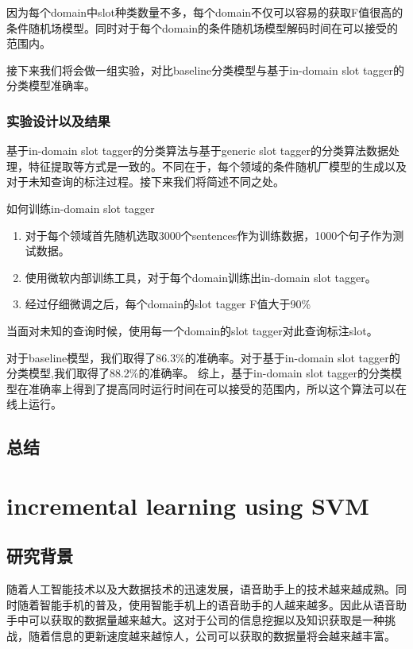 \documentclass[master]{njuthesis}
\begin{document}
\begin{enumerate}
\begin{enumerate}
\begin{enumerate}
    因为每个domain中slot种类数量不多，每个domain不仅可以容易的获取F值很高的条件随机场模型。同时对于每个domain的条件随机场模型解码时间在可以接受的范围内。
    
    接下来我们将会做一组实验，对比baseline分类模型与基于in-domain slot tagger的分类模型准确率。

\subsection{实验设计以及结果}
    
    基于in-domain slot tagger的分类算法与基于generic slot tagger的分类算法数据处理，特征提取等方式是一致的。不同在于，每个领域的条件随机厂模型的生成以及对于未知查询的标注过程。接下来我们将简述不同之处。
   
    如何训练in-domain slot tagger
    \begin{enumerate}
      \item 对于每个领域首先随机选取3000个sentences作为训练数据，1000个句子作为测试数据。
      \item 使用微软内部训练工具，对于每个domain训练出in-domain slot tagger。
      \item 经过仔细微调之后，每个domain的slot tagger F值大于90\%
    \end{enumerate}

    当面对未知的查询时候，使用每一个domain的slot tagger对此查询标注slot。

    对于baseline模型，我们取得了86.3\%的准确率。对于基于in-domain slot tagger的分类模型,我们取得了88.2\%的准确率。
    综上，基于in-domain slot tagger的分类模型在准确率上得到了提高同时运行时间在可以接受的范围内，所以这个算法可以在线上运行。

\section{总结}


\chapter{incremental learning using SVM}\label{chapter_smallworld}

\section{研究背景}

   随着人工智能技术以及大数据技术的迅速发展，语音助手上的技术越来越成熟。同时随着智能手机的普及，使用智能手机上的语音助手的人越来越多。因此从语音助手中可以获取的数据量越来越大。这对于公司的信息挖掘以及知识获取是一种挑战，随着信息的更新速度越来越惊人，公司可以获取的数据量将会越来越丰富。
   

\end{enumerate}
\end{enumerate}
\end{enumerate}
\end{document}
